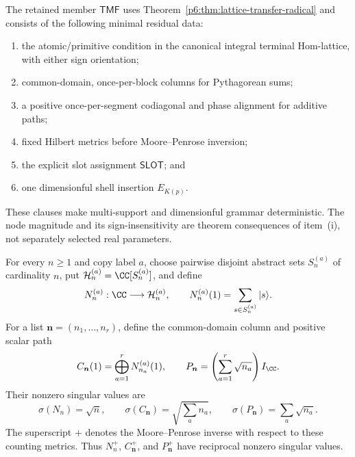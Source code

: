\documentclass[12pt,a4paper]{article}
\begin{document}
\begin{definition}
\label{p6:def:terminal-mass-functor}
The retained member \(\mathsf{TMF}\) uses
Theorem~\ref{p6:thm:lattice-transfer-radical} and consists of the following
minimal residual data:
\begin{enumerate}[label=(\roman*),leftmargin=2em]
\item the atomic/primitive condition in the canonical integral terminal
Hom-lattice, with either sign orientation;
\item common-domain, once-per-block columns for Pythagorean sums;
\item a positive once-per-segment codiagonal and phase alignment for
additive paths;
\item fixed Hilbert metrics before Moore--Penrose inversion;
\item the explicit slot assignment \(\mathsf{SLOT}\); and
\item one dimensionful shell insertion \(E_{K(p)}\).
\end{enumerate}
These clauses make multi-support and dimensionful grammar deterministic.  The
node magnitude and its sign-insensitivity are theorem consequences of item~(i),
not separately selected real parameters.
\end{definition}

\begin{definition}
\label{p6:def:canonical-terminal-primitives}
For every \(n\ge1\) and copy label \(a\), choose pairwise disjoint abstract
sets \(S_n^{(a)}\) of cardinality \(n\), put
\(\mathcal H_n^{(a)}=\CC[S_n^{(a)}]\), and define
\[
N_n^{(a)}:\CC\longrightarrow\mathcal H_n^{(a)},
\qquad
N_n^{(a)}(1)=\sum_{s\in S_n^{(a)}}|s\rangle.
\]
For a list \(\boldsymbol n=(n_1,\ldots,n_r)\), define the common-domain
column and positive scalar path
\[
C_{\boldsymbol n}(1)
=
\bigoplus_{a=1}^rN_{n_a}^{(a)}(1),
\qquad
P_{\boldsymbol n}
=
\left(\sum_{a=1}^r\sqrt{n_a}\right)I_{\CC}.
\]
Their nonzero singular values are
\[
\sigma(N_n)=\sqrt n,\qquad
\sigma(C_{\boldsymbol n})=\sqrt{\sum_an_a},\qquad
\sigma(P_{\boldsymbol n})=\sum_a\sqrt{n_a}.
\]
The superscript \(+\) denotes the Moore--Penrose inverse with respect to
these counting metrics.  Thus \(N_n^+\), \(C_{\boldsymbol n}^+\), and
\(P_{\boldsymbol n}^+\) have reciprocal nonzero singular values.
\end{definition}
\end{document}
